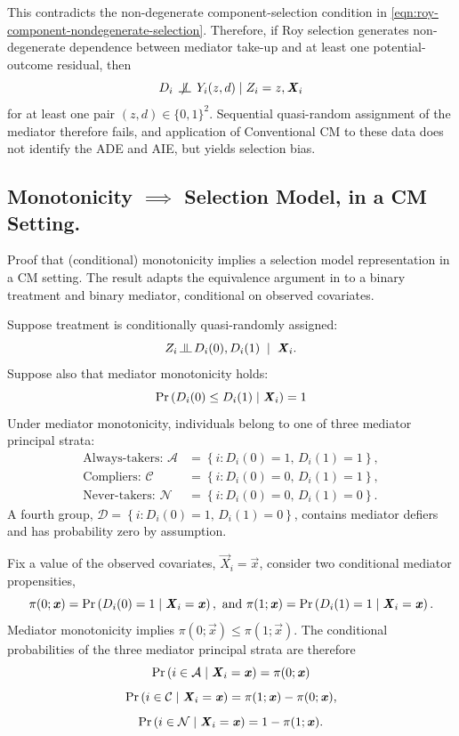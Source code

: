 This contradicts the non-degenerate component-selection condition in
\eqref{eqn:roy-component-nondegenerate-selection}.
Therefore, if Roy selection generates non-degenerate dependence between mediator take-up and at least one potential-outcome residual, then
\[
    D_i
    \centernot\indep
    Y_i(z,d)
    \mid
    Z_i=z,
    \vec X_i
\]
for at least one pair $(z,d) \in \{0,1\}^2$.
Sequential quasi-random assignment of the mediator therefore fails, and application of Conventional CM to these data does not identify the ADE and AIE, but yields selection bias.


\subsection{Monotonicity $\implies$ Selection Model, in a CM Setting.}
\label{appendix:mte-monotonicity}
Proof that (conditional) monotonicity implies a selection model representation in a CM setting.
The result adapts the equivalence argument in \cite{vytlacil2002independence} to a binary treatment and binary mediator, conditional on observed covariates.

Suppose treatment is conditionally quasi-randomly assigned:
\[
    Z_i
    \indep
        D_i(0),
        D_i(1)
    \; \mid \;
    \vec X_i. \]
Suppose also that mediator monotonicity holds:
\[
    \Pr\left( 
        D_i(0)
        \leq
        D_i(1)
        \mid
        \boldsymbol{\mathit{X}}_i
     \right)
    =
    1
\]
Under mediator monotonicity, individuals belong to one of three mediator principal strata:
\[
    \begin{aligned}
        \text{Always-takers: } \mathcal A
        &=
        \left\{
            i:
            D_i(0)=1,\,
            D_i(1)=1
        \right\},
        \\
        \text{Compliers: } \mathcal C
        &=
        \left\{
            i:
            D_i(0)=0,\,
            D_i(1)=1
        \right\},
        \\
        \text{Never-takers: } \mathcal N
        &=
        \left\{
            i:
            D_i(0)=0,\,
            D_i(1)=0
        \right\}.
    \end{aligned}
\]
A fourth group, $\mathcal D=
    \left\{
        i:
        D_i(0)=1,\,
        D_i(1)=0
    \right\}$,
contains mediator defiers and has probability zero by assumption.

Fix a value of the observed covariates, $\vec X_i=\vec x$, consider  two conditional mediator propensities,
\[
    \pi(0;\boldsymbol{\mathit{x}})
    =
    \Pr\left( 
        D_i(0)=1
        \mid
        \boldsymbol{\mathit{X}}_i=\boldsymbol{\mathit{x}}
     \right), \text{ and }
    \pi(1; \boldsymbol{\mathit{x}})
    =
    \Pr\left( 
        D_i(1)=1
        \mid
        \boldsymbol{\mathit{X}}_i=\boldsymbol{\mathit{x}}
     \right).
\]
Mediator monotonicity implies $ \pi(0;\vec x) \leq \pi(1;\vec x)$.
The conditional probabilities of the three mediator principal strata are therefore
\[
    \Pr\left( 
        i \in \mathcal A
        \mid
        \boldsymbol{\mathit{X}}_i=\boldsymbol{\mathit{x}}
     \right)
    =
    \pi(0;\boldsymbol{\mathit{x}})
\]
\[
    \Pr\left( 
        i \in \mathcal C
        \mid
        \boldsymbol{\mathit{X}}_i=\boldsymbol{\mathit{x}}
     \right)
    =
    \pi(1;\boldsymbol{\mathit{x}})-\pi(0;\boldsymbol{\mathit{x}}),
\]
\[
    \Pr\left( 
        i \in \mathcal N
        \mid
        \boldsymbol{\mathit{X}}_i=\boldsymbol{\mathit{x}}
     \right)
    =
    1-\pi(1;\boldsymbol{\mathit{x}}).
\]


